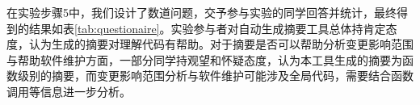 
在实验步骤5中，我们设计了数道问题，交予参与实验的同学回答并统计，最终得到的结果如表\ref{tab:questionaire}。实验参与者对自动生成摘要工具总体持肯定态度，认为生成的摘要对理解代码有帮助。对于摘要是否可以帮助分析变更影响范围与帮助软件维护方面，一部分同学持观望和怀疑态度，认为本工具生成的摘要为函数级别的摘要，而变更影响范围分析与软件维护可能涉及全局代码，需要结合函数调用等信息进一步分析。

